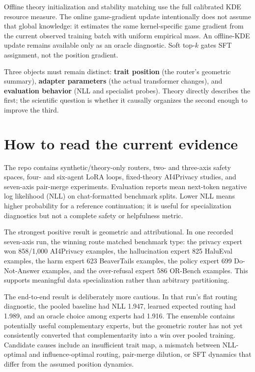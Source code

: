 \documentclass[11pt]{article}
\begin{document}
Offline theory initialization and stability matching use the full calibrated KDE
resource measure. The online game-gradient update intentionally does not assume that
global knowledge: it estimates the same kernel-specific game gradient from the current
observed training batch with uniform empirical mass. An offline-KDE update remains
available only as an oracle diagnostic. Soft top-$k$ gates SFT assignment, not the
position gradient.

Three objects must remain distinct: \textbf{trait position} (the router's geometric
summary), \textbf{adapter parameters} (the actual transformer changes), and
\textbf{evaluation behavior} (NLL and specialist probes). Theory directly describes the
first; the scientific question is whether it causally organizes the second enough to
improve the third.

\section{How to read the current evidence}
The repo contains synthetic/theory-only routers, two- and three-axis safety spaces,
four- and six-agent LoRA loops, fixed-theory AI4Privacy studies, and seven-axis
pair-merge experiments. Evaluation reports mean next-token negative log likelihood
(NLL) on chat-formatted benchmark splits. Lower NLL means higher probability for a
reference continuation; it is useful for specialization diagnostics but not a complete
safety or helpfulness metric.

The strongest positive result is geometric and attributional. In one recorded seven-axis
run, the winning route matched benchmark type: the privacy expert won 858/1,000
AI4Privacy examples, the hallucination expert 825 HaluEval examples, the harm expert
623 BeaverTails examples, the policy expert 699 Do-Not-Answer examples, and the
over-refusal expert 586 OR-Bench examples. This supports meaningful data specialization
rather than arbitrary partitioning.

The end-to-end result is deliberately more cautious. In that run's flat routing
diagnostic, the pooled baseline had NLL 1.947, learned expected routing had 1.989, and
an oracle choice among experts had 1.916. The ensemble contains potentially useful
complementary experts, but the geometric router has not yet consistently converted that
complementarity into a win over pooled training. Candidate causes include an insufficient
trait map, a mismatch between NLL-optimal and influence-optimal routing, pair-merge
dilution, or SFT dynamics that differ from the assumed position dynamics.
\end{document}
